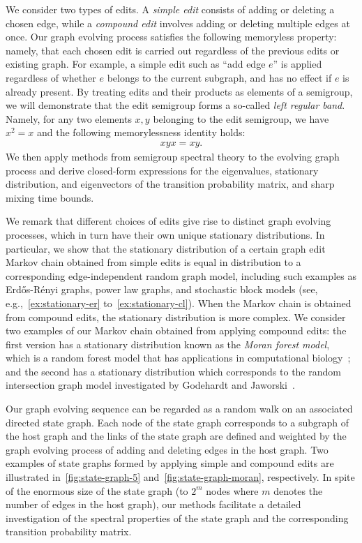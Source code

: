 \documentclass[11pt,a4paper]{article}
\begin{document}
We consider two types of edits. A \emph{simple edit} consists of adding or deleting a chosen edge, while a \emph{compound edit} involves adding or deleting multiple edges at once. Our graph evolving process satisfies the following memoryless property: namely, that each chosen edit is carried out regardless of the previous edits or existing graph. For example, a simple edit such as ``add edge $e$'' is applied regardless of whether $e$ belongs to the current subgraph, and has no effect if $e$ is already present. By treating edits and their products as elements of a semigroup, we will demonstrate that the edit semigroup forms a so-called \emph{left regular band}. Namely, for any two elements $x, y$ belonging to the edit semigroup, we have $x^2=x$ and the following memorylessness identity holds:
    \begin{align}\label{eq:memorylessness}
        xyx = xy.
    \end{align}
We then apply methods from semigroup spectral theory to the evolving graph process and derive closed-form expressions for the eigenvalues, stationary distribution, and eigenvectors of the transition probability matrix, and sharp mixing time bounds.

We remark that different choices of edits give rise to distinct graph evolving processes, which in turn have their own unique stationary distributions. In particular, we show that the stationary distribution of a certain graph edit Markov chain obtained from simple edits is equal in distribution to a corresponding edge-independent random graph model, including such examples as Erd\H{o}s-R\'{e}nyi graphs, power law graphs, and stochastic block models (see, e.g.,~\cref{ex:stationary-er} to~\cref{ex:stationary-cl}). When the Markov chain is obtained from compound edits, the stationary distribution is more complex. We consider two examples of our Markov chain obtained from applying compound edits: the first version has a stationary distribution known as the \emph{Moran forest model}, which is a random forest model that has applications in computational biology~\cite{bienvenuMoranForest2021}; and the second has a stationary distribution which corresponds to the random intersection graph model investigated by Godehardt and Jaworski~\cite{godehardt2001two}. 

Our graph evolving sequence can be regarded as a random walk on an associated directed state graph. Each node of the state graph corresponds to a subgraph of the host graph and the links of the state graph are defined and weighted by the graph evolving process of adding and deleting edges in the host graph. Two examples of state graphs formed by applying simple and compound edits are illustrated in~\cref{fig:state-graph-5} and~\cref{fig:state-graph-moran}, respectively. In spite of the enormous size of the state graph (to $2^m$ nodes where $m$ denotes the number of edges in the host graph), our methods facilitate a detailed investigation of the spectral properties of the state graph and the corresponding transition probability matrix.
\end{document}
